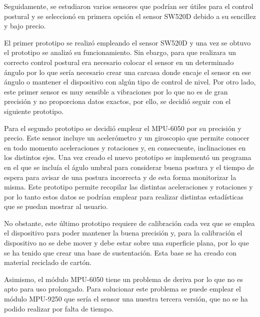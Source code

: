 Seguidamente, se estudiaron varios sensores que podrían ser útiles para el control postural y se seleccionó en primera opción el sensor SW520D debido a su sencillez y bajo precio.

El primer prototipo se realizó empleando el sensor SW520D y una vez se obtuvo el prototipo se analizó su funcionamiento. Sin ebargo, para que realizara un correcto control postural era necesario colocar el sensor en un determinado ángulo por lo que sería necesario crear una carcasa donde encaje el sensor en ese ángulo o mantener el dispositivo con algún tipo de control de nivel. Por otro lado, este primer sensor es muy sensible a vibraciones por lo que no es de gran precisión y no proporciona datos exactos, por ello, se decidió seguir con el siguiente prototipo.

Para el segundo prototipo se decidió emplear el MPU-6050 por su precisión y precio. Este sensor incluye un acelerómetro y un giroscopio que permite conocer en todo momento aceleraciones y rotaciones y, en consecuente, inclinaciones en los distintos ejes. Una vez creado el nuevo prototipo se implementó un programa en el que se incluía el águlo umbral para considerar buena postura y el tiempo de espera para avisar de una postura incorrecta y de esta forma monitorizar la misma. Este prototipo permite recopilar las distintas aceleraciones y rotaciones y por lo tanto estos datos se podrían emplear para realizar distintas estadísticas que se puedan mostrar al usuario.

No obstante, este último prototipo requiere de calibración cada vez que se emplea el dispositivo para poder mantener la buena precisión y, para la calibración el dispositivo no se debe mover y debe estar sobre una superficie plana, por lo que se ha tenido que crear una base de sustentación. Esta base se ha creado con material reciclado de cartón.

Asimismo, el módulo MPU-6050 tiene un problema de deriva por lo que no es apto para uso prolongado. Para solucionar este problema se puede emplear el módulo MPU-9250 que sería el sensor una nuestra tercera versión, que no se ha podido realizar por falta de tiempo.




